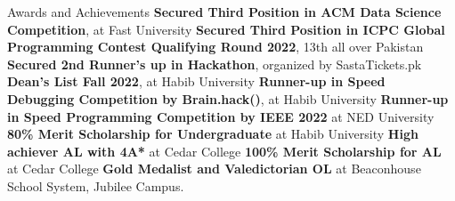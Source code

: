 \begin{rubric}{Awards and Achievements}
    \entry*\textbf{Secured Third Position in ACM Data Science Competition}, at Fast University
    \entry*\textbf{Secured Third Position in ICPC Global Programming Contest Qualifying Round 2022}, 13th all over Pakistan
    \entry*\textbf{Secured 2nd Runner's up in Hackathon}, organized by SastaTickets.pk
    \entry*\textbf{Dean's List Fall 2022}, at Habib University
    \entry*\textbf{Runner-up in Speed Debugging Competition by Brain.hack()}, at Habib University
    \entry*\textbf{Runner-up in Speed Programming Competition by IEEE 2022} at NED University
    \entry*\textbf{80\% Merit Scholarship for Undergraduate} at Habib University
    \entry*\textbf{High achiever AL with 4A*} at Cedar College
    \entry*\textbf{100\% Merit Scholarship for AL} at Cedar College
    \entry*\textbf{Gold Medalist and Valedictorian OL} at Beaconhouse School System, Jubilee Campus.

    \end{rubric}
    